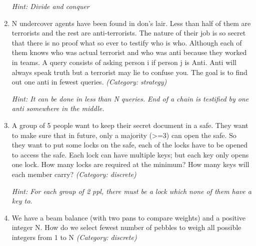 \begin{enumerate}
\small\emph{Hint: Divide and conquer}





\item N undercover agents have been found in don's lair. Less than half of them are terrorists and the rest are anti-terrorists. The nature of their job is so secret that there is no proof what so ever to testify who is who. Although each of them knows who was actual terrorist and who was anti because they worked in teams. A query consists of asking person i if person j is Anti. Anti will always speak truth but a terrorist may lie to confuse you. The goal is to find out one anti in fewest queries.
\small\emph{(Category: strategy)}

\small\emph{Hint: It  can be done in less than N queries. End of a chain is testified by one anti somewhere in the middle.}





\item A group of 5 people want to keep their secret document in a safe. They want to make sure that in future, only a majority (>=3) can open the safe. So they want to put some locks on the safe, each of the locks have to be opened to access the safe. Each lock can have multiple keys; but each key only opens one lock. How many locks are required at the minimum? How many keys will each member carry?
\small\emph{(Category: discrete)}

\small\emph{Hint: For each group of 2 ppl, there must be a lock which none of them have a key to.}





\item We have a beam balance (with two pans to compare weights) and a positive integer N. How do we select fewest number of pebbles to weigh all possible integers from 1 to N
\small\emph{(Category: discrete)}




\end{enumerate}
